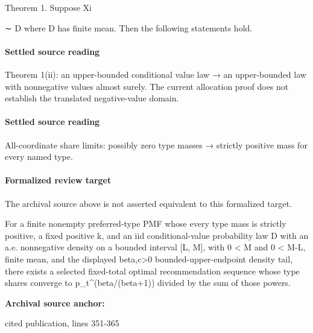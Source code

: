 \documentclass[10pt]{article}
\begin{document}
\begin{ReviewVerbatim}

Theorem 1. Suppose Xi

∼ D where D has finite mean. Then the following statements hold.
\end{ReviewVerbatim}

\paragraph{Settled source reading}
\begin{sloppypar}
Theorem 1(ii):\allowbreak{} an upper-\allowbreak{}bounded conditional value law → an upper-\allowbreak{}bounded law with nonnegative values almost surely.\allowbreak{} The current allocation proof does not establish the translated negative-\allowbreak{}value domain.\allowbreak{}
\end{sloppypar}
\paragraph{Settled source reading}
\begin{sloppypar}
All-\allowbreak{}coordinate share limits:\allowbreak{} possibly zero type masses → strictly positive mass for every named type.\allowbreak{}
\end{sloppypar}
\paragraph{Formalized review target}
The archival source above is not asserted equivalent to this formalized target.
\begin{ReviewVerbatim}
For a finite nonempty preferred-type PMF whose every type mass is strictly positive, a fixed positive k, and an iid conditional-value probability law D with an a.e. nonnegative density on a bounded interval [L, M], with 0 < M and 0 < M-L, finite mean, and the displayed beta,c>0 bounded-upper-endpoint density tail, there exists a selected fixed-total optimal recommendation sequence whose type shares converge to p_t^(beta/(beta+1)) divided by the sum of those powers.
\end{ReviewVerbatim}

\textbf{Archival source anchor:} {\footnotesize\raggedright cited publication, lines 351-\allowbreak{}365\par}
\end{document}
